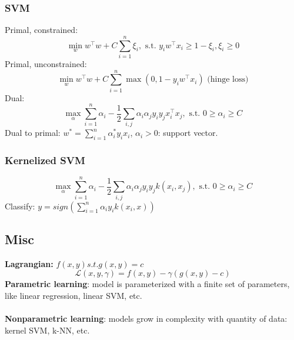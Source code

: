 \documentclass[main]{subfiles}
\begin{document}
\begin{landscape}
\begin{multicols}{4}
{\color{subsubsectionColor}\subsubsection{SVM}}
Primal, constrained:
\begin{equation}
\min_{w} w^\top w + C \sum_{i=1}^{n} \xi_i, \text{ s.t. } y_i w^\top x_i \geq 1 - \xi_i, \xi_i \geq 0
\end{equation}
Primal, unconstrained:
\begin{equation}
\min_{w} w^\top w + C \sum_{i=1}^{n} \max(0, 1-y_i w^\top x_i) \text{ (hinge loss)}
\end{equation}
Dual:
\begin{equation}
\max_{\alpha} \sum_{i=1}^{n} \alpha_i - \frac{1}{2} \sum_{i,j} \alpha_i \alpha_j y_i y_j x_i^\top x_j, \text{ s.t. } 0 \geq \alpha_i \geq C
\end{equation}
Dual to primal: $w^* = \sum_{i=1}^{n} \alpha^*_i y_i x_i$, $\alpha_i > 0$: support vector.

{\color{subsubsectionColor}\subsubsection{Kernelized SVM}}
\begin{equation}
\max_{\alpha} \sum_{i=1}^{n} \alpha_i - \frac{1}{2} \sum_{i,j} \alpha_i \alpha_j y_i y_j k(x_i, x_j), \text{ s.t. } 0 \geq \alpha_i \geq C
\end{equation}
Classify: $y = sign(\sum_{i=1}^{n} \alpha_i y_i k(x_i, x))$

{\color{subsectionColor}\subsection{Misc}}
\textbf{Lagrangian:} $f(x,y) s.t. g(x,y) = c$
\begin{equation}
\mathcal{L}(x, y, \gamma) = f(x,y) - \gamma ( g(x,y)-c)
\end{equation}
\textbf{Parametric learning}: model is parameterized with a finite set of parameters, like linear regression, linear SVM, etc. \\ \\
\textbf{Nonparametric learning}: models grow in complexity with quantity of data: kernel SVM, k-NN, etc.


\end{multicols}
\end{landscape}
\end{document}
